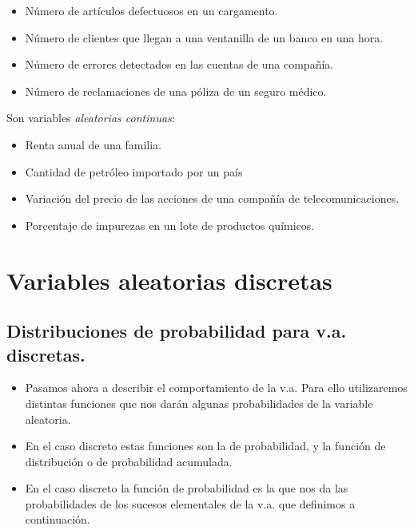 \documentclass[]{book}
\providecommand{\tightlist}{%
  \setlength{\itemsep}{0pt}\setlength{\parskip}{0pt}}
\begin{document}
\begin{itemize}
\tightlist
\item
  Número de artículos defectuosos en un cargamento.
\item
  Número de clientes que llegan a una ventanilla de un banco en una hora.
\item
  Número de errores detectados en las cuentas de una compañía.
\item
  Número de reclamaciones de una póliza de un seguro médico.
\end{itemize}

Son variables \emph{aleatorias continuas}:

\begin{itemize}
\tightlist
\item
  Renta anual de una familia.
\item
  Cantidad de petróleo importado por un país
\item
  Variación del precio de las acciones de una compañía de telecomunicaciones.
\item
  Porcentaje de impurezas en un lote de productos químicos.
\end{itemize}

\hypertarget{variables-aleatorias-discretas}{%
\section{Variables aleatorias discretas}\label{variables-aleatorias-discretas}}

\hypertarget{distribuciones-de-probabilidad-para-v.a.-discretas.}{%
\subsection{Distribuciones de probabilidad para v.a. discretas.}\label{distribuciones-de-probabilidad-para-v.a.-discretas.}}

\begin{itemize}
\tightlist
\item
  Pasamos ahora a describir el comportamiento de la v.a.
  Para ello utilizaremos distintas
  funciones que nos darán algunas probabilidades de la variable aleatoria.
\item
  En el caso discreto estas funciones son la de probabilidad, y la función de distribución o de probabilidad acumulada.
\item
  En el caso discreto la función de probabilidad es la que nos da las probabilidades de los
  sucesos elementales de la v.a. que definimos a continuación.
\end{itemize}
\end{document}
